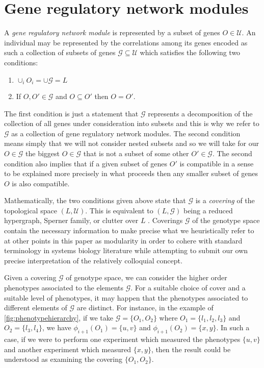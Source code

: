 \section{Gene regulatory network modules}\label{sec:covergenotypespace}
A \emph{gene regulatory network module} is represented by a subset of genes $O \in \mathcal{U}$. An individual may be represented by the correlations among its genes encoded as such a collection of subsets of genes $\mathcal{G} \subseteq \mathcal{U}$ which satisfies the following two conditions:
\begin{enumerate}
\item $\cup_i O_i = \cup \mathcal{G} = L$
\item If $O,O' \in \mathcal{G}$ and $O \subseteq O'$ then $O = O'$.
\end{enumerate}
The first condition is just a statement that $\mathcal{G}$ represents a decomposition of the collection of all genes under consideration into subsets and this is why we refer to $\mathcal{G}$ as a collection of gene regulatory network modules. The second condition means simply that we will not consider nested subsets and so we will take for our $O \in \mathcal{G}$ the biggest $O \in \mathcal{G}$ that is not a subset of some other $O' \in \mathcal{G}$. The second condition also implies that if a given subset of genes $O'$ is compatible in a sense to be explained more precisely in what proceeds then any smaller subset of genes $O$ is also compatible.

Mathematically, the two conditions given above state that $\mathcal{G}$ is a \emph{covering} of the topological space $(L, \mathcal {U})$.  This is equivalent to $(L, \mathcal{G})$ being a reduced hypergraph, Sperner family, or clutter over $L$ \cite{Lauritzen1996}.  Coverings $\mathcal{G}$ of the genotype space contain the necessary information to make precise what we heuristically refer to at other points in this paper as modularity in order to cohere with standard terminology in systems biology literature while attempting to submit our own precise interpretation of the relatively colloquial concept.

Given a covering $\mathcal{G}$ of genotype space, we can consider the higher order phenotypes associated to the elements $\mathcal{G}$.  For a suitable choice of cover and a suitable level of phenotypes, it may happen that the phenotypes associated to different elements of $\mathcal{G}$ are distinct.  For instance, in the example of \ref{fig:phenotypehierarchy}, if we take $\mathcal{G} = \{O_1, O_2\}$ where $O_1 = \{l_1, l_2, l_3\}$ and $O_2 = \{l_3, l_4\}$, we have $\phi_{i+1}(O_1) = \{u,v\}$ and $\phi_{i+1}(O_2) = \{x,y\}$.  In such a case, if we were to perform one experiment which measured the phenotypes $\{u,v\}$ and another experiment which measured $\{x,y\}$, then the result could be understood as examining the covering $\{O_1, O_2\}$.

